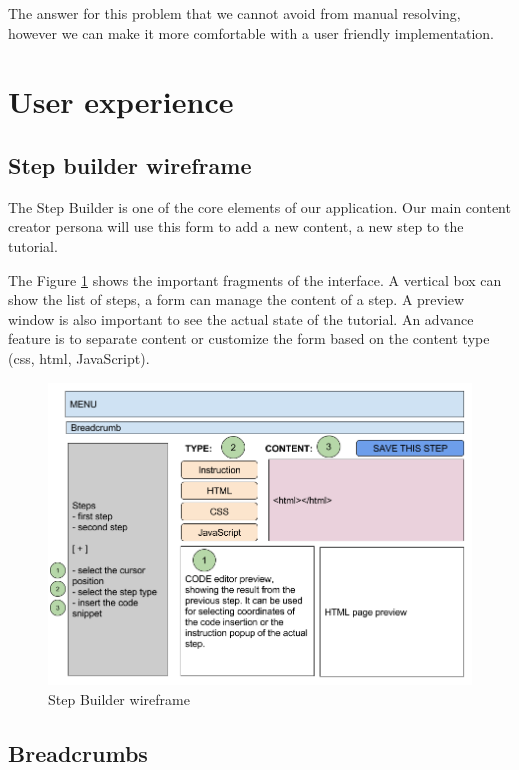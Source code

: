 \documentclass[11pt, a4paper, oneside, openright, medskipamount]{report}
\begin{document}
The answer for this problem that we cannot avoid from manual resolving, however we can make it more comfortable with a user friendly implementation.

\section{User experience}

\subsection{Step builder wireframe}

The Step Builder is one of the core elements of our application. Our main content creator persona will use this form to add a new content, a new step to the tutorial.

The Figure \ref{fig:step-builder-wireframe} shows the important fragments of the interface. A vertical box can show the list of steps, a form can manage the content of a step. A preview window is also important to see the actual state of the tutorial. An advance feature is to separate content or customize the form based on the content type (css, html, JavaScript).

\begin{figure}[ht]
\centering
\includegraphics[width=1\textwidth]{assets/step-builder-wireframe.png}
\caption{Step Builder wireframe}
\label{fig:step-builder-wireframe}
\end{figure}

\subsection{Breadcrumbs}
\end{document}
